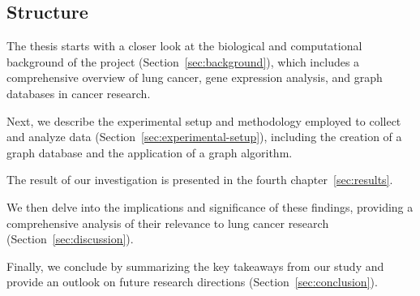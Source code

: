\subsection{Structure}  \label{subsec:structure}
The thesis starts with a closer look at the biological and computational background of the project (Section~\ref{sec:background}),
which includes a comprehensive overview of lung cancer, gene expression analysis, and graph databases in cancer research.

Next, we describe the experimental setup and methodology employed to collect and analyze data (Section~\ref{sec:experimental-setup}),
including the creation of a graph database and the application of a graph algorithm.

The result of our investigation is presented in the fourth chapter~\ref{sec:results}.

We then delve into the implications and significance of these findings,
providing a comprehensive analysis of their relevance to lung cancer research (Section~\ref{sec:discussion}).

Finally, we conclude by summarizing the key takeaways from our study and provide an outlook
on future research directions (Section~\ref{sec:conclusion}).
